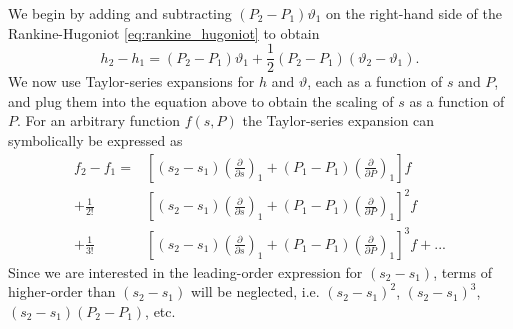 \documentclass[oneside,a4paper,11pt]{report}
\begin{document}
We begin by adding and subtracting $(P_2 - P_1) \vartheta_1$ on the right-hand side of the Rankine-Hugoniot \cref{eq:rankine_hugoniot} to obtain
\begin{equation}
\label{eq:rankine_hugoniot_vartheta}
    h_2 - h_1 = (P_2 - P_1) \vartheta_1 + \frac{1}{2} (P_2 - P_1) (\vartheta_2 - \vartheta_1).
\end{equation}
We now use Taylor-series expansions for $h$ and $\vartheta$, each as a function of $s$ and $P$, and plug them into the equation above to obtain the scaling of $s$ as a function of $P$. For an arbitrary function $f(s,P)$ the Taylor-series expansion can symbolically be expressed as
\begin{align}
    f_2 - f_1 = &\left [ (s_2 - s_1) \left ( \frac{\partial}{\partial s} \right)_1 + (P_1 - P_1) \left( \frac{\partial}{\partial P} \right)_1 \right ] f \nonumber \\
    + \frac{1}{2! } &\left [ (s_2 - s_1) \left ( \frac{\partial}{\partial s} \right)_1 + (P_1 - P_1) \left( \frac{\partial}{\partial P} \right)_1 \right ]^2 f \nonumber \\
    + \frac{1}{3!}  &\left [ (s_2 - s_1) \left ( \frac{\partial}{\partial s} \right)_1 + (P_1 - P_1) \left( \frac{\partial}{\partial P} \right)_1 \right ]^3 f + ...\nonumber
\end{align}
Since we are interested in the leading-order expression for $(s_2 - s_1)$, terms of higher-order than $(s_2 - s_1)$ will be neglected, i.e. $(s_2 - s_1)^2$, $(s_2 - s_1)^3$, $(s_2 - s_1) (P_2 - P_1)$, etc. 
\end{document}
